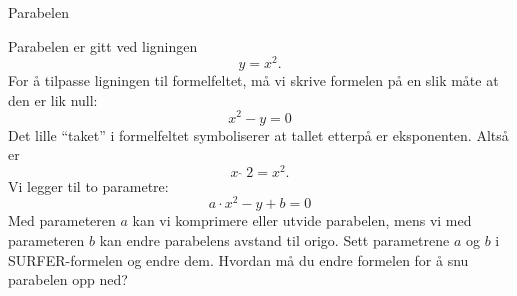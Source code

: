 \documentclass[no]{./../../common/SurferDesc}%
\begin{document}
\footnotesize
%
\begin{surferPage}
  \begin{surferTitle}Parabelen\end{surferTitle}
   \begin{surferText}
   
Parabelen er gitt ved ligningen \[y=x^2.\]
For å tilpasse ligningen til formelfeltet, må vi skrive formelen på en slik måte at den er lik null:
\[x^2-y=0\]
Det lille \enquote{taket} i formelfeltet symboliserer at tallet etterpå er eksponenten. Altså er
\[ x  \,\hat{\ } \, 2 =x^2.\]
Vi legger til to parametre:
\[a \cdot x^2-y+b=0\]
Med parameteren $a$ kan vi komprimere eller utvide parabelen, mens vi med parameteren $b$ kan endre parabelens avstand til origo. 
\newline
Sett parametrene $a$ og $b$ i SURFER-formelen og endre dem. Hvordan må du endre formelen for å snu parabelen opp ned?
\end{surferText}
\end{surferPage}
\end{document}
